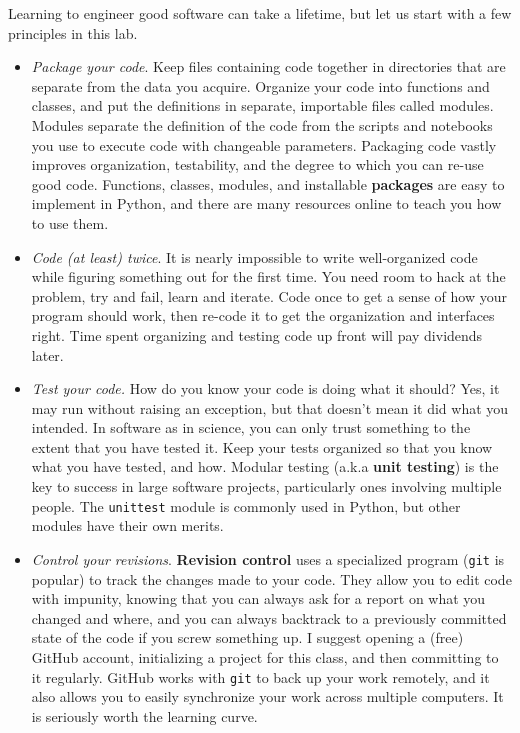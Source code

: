 \documentclass[11pt,preprint]{aastex}
\begin{document}
Learning to engineer good software can take a lifetime, but let us start with a few
principles in this lab.

\begin{itemize}

\item {\it Package your code}.  Keep files containing code together in 
directories that are separate from the data you acquire.  
Organize your code into functions and classes, and put the definitions in separate, importable files called modules.  
Modules separate the definition
of the code from the scripts and notebooks you use to execute code with changeable parameters. Packaging code vastly improves
organization, testability, and the degree to which you can re-use good code. Functions, classes, modules, and installable {\bf packages}
are easy to implement in Python, and there are many resources online to teach you how to use them. 

\item {\it Code (at least) twice}. It is nearly impossible to write well-organized code while figuring
something out for the first time. You need room to hack at the problem, try and fail, learn and iterate.
Code once to get a sense of how your program should work, then
re-code it to get the organization and interfaces right. Time spent organizing and testing code up front will pay
dividends later.

\item {\it Test your code.} How do you know your code is doing what it should? Yes, it may run
without raising an exception, but that doesn't mean it did what you intended. In software as in science,
you can only trust something to the extent that you have tested it.
Keep your tests organized so that you know what you have tested, and how. Modular testing (a.k.a 
{\bf unit testing}) is the key to success in large
software projects, particularly ones involving multiple people. The {\tt unittest} module is 
commonly used in Python, but other modules have their own merits.

\item{\it Control your revisions}.  {\bf Revision control} uses a specialized program ({\tt git} is popular) to
track the changes made to your code. They allow you to edit code with impunity, knowing that you can
always ask for a report on what you changed and where, and you can always backtrack to a previously committed
state of the code if you screw something up.
I suggest opening a (free) GitHub account, initializing a project
for this class, and then committing to it regularly.  GitHub works with {\tt git} to back up your work remotely, and it also 
allows you to easily synchronize your work across multiple computers.  It is seriously worth the learning curve.

\end{itemize}
\end{document}
